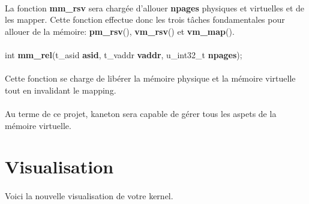 \documentclass[10pt,a4wide]{article}
\begin{document}
\paragraph{}

La fonction \textbf{mm\_rsv} sera charg\'ee d'allouer \textbf{npages} physiques
et virtuelles et de les mapper. Cette fonction effectue donc les trois
t\^aches fondamentales pour allouer de la m\'emoire: \textbf{pm\_rsv}(),
\textbf{vm\_rsv}() et \textbf{vm\_map}().

\paragraph{}

\hspace{1.5cm}int \textbf{mm\_rel}(t\_asid \textbf{asid},
                                   t\_vaddr \textbf{vaddr},
                                   u\_int32\_t \textbf{npages});

\paragraph{}

Cette fonction se charge de lib\'erer la m\'emoire physique et la m\'emoire
virtuelle tout en invalidant le mapping.

\paragraph{}

Au terme de ce projet, kaneton sera capable de g\'erer tous les aspets
de la m\'emoire virtuelle.

\section{Visualisation}

\paragraph{}

Voici la nouvelle visualisation de votre kernel.
\end{document}
